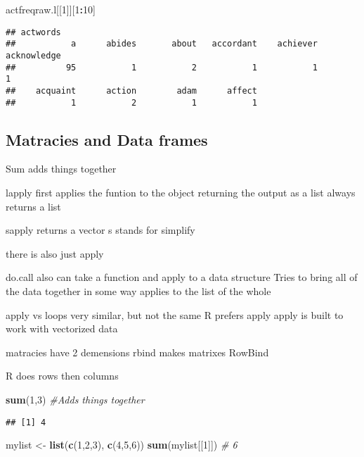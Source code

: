 \documentclass[
]{article}
\newenvironment{Shaded}{\begin{snugshade}}{\end{snugshade}}
\newcommand{\CommentTok}[1]{\textcolor[rgb]{0.56,0.35,0.01}{\textit{#1}}}
\newcommand{\DecValTok}[1]{\textcolor[rgb]{0.00,0.00,0.81}{#1}}
\newcommand{\KeywordTok}[1]{\textcolor[rgb]{0.13,0.29,0.53}{\textbf{#1}}}
\newcommand{\NormalTok}[1]{#1}
\newcommand{\OperatorTok}[1]{\textcolor[rgb]{0.81,0.36,0.00}{\textbf{#1}}}
\newcommand{\StringTok}[1]{\textcolor[rgb]{0.31,0.60,0.02}{#1}}
\begin{document}
\begin{Shaded}
\begin{Highlighting}[]
\NormalTok{actfreqraw.l[[}\DecValTok{1}\NormalTok{]][}\DecValTok{1}\OperatorTok{:}\DecValTok{10}\NormalTok{]}
\end{Highlighting}
\end{Shaded}

\begin{verbatim}
## actwords
##           a      abides       about   accordant    achiever acknowledge 
##          95           1           2           1           1           1 
##    acquaint      action        adam      affect 
##           1           2           1           1
\end{verbatim}

\hypertarget{matracies-and-data-frames}{%
\subsection{Matracies and Data frames}\label{matracies-and-data-frames}}

Sum adds things together

lapply first applies the funtion to the object returning the output as a
list always returns a list

sapply returns a vector s stands for simplify

there is also just apply

do.call also can take a function and apply to a data structure Tries to
bring all of the data together in some way applies to the list of the
whole

apply vs loops very similar, but not the same R prefers apply apply is
built to work with vectorized data

matracies have 2 demensions rbind makes matrixes RowBind

R does rows then columns

\begin{Shaded}
\begin{Highlighting}[]
\KeywordTok{sum}\NormalTok{(}\DecValTok{1}\NormalTok{,}\DecValTok{3}\NormalTok{) }\CommentTok{#Adds things together}
\end{Highlighting}
\end{Shaded}

\begin{verbatim}
## [1] 4
\end{verbatim}

\begin{Shaded}
\begin{Highlighting}[]
\NormalTok{mylist <-}\StringTok{ }\KeywordTok{list}\NormalTok{(}\KeywordTok{c}\NormalTok{(}\DecValTok{1}\NormalTok{,}\DecValTok{2}\NormalTok{,}\DecValTok{3}\NormalTok{), }\KeywordTok{c}\NormalTok{(}\DecValTok{4}\NormalTok{,}\DecValTok{5}\NormalTok{,}\DecValTok{6}\NormalTok{))}
\KeywordTok{sum}\NormalTok{(mylist[[}\DecValTok{1}\NormalTok{]]) }\CommentTok{# 6}
\end{Highlighting}
\end{Shaded}
\end{document}
